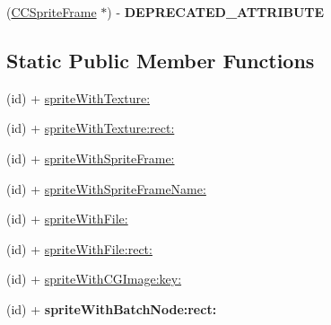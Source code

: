 \begin{DoxyCompactItemize}
\item 
\hypertarget{class_c_c_sprite_a900f618dd7bdba3577593ba08ce3a016}{(\hyperlink{interface_c_c_sprite_frame}{C\-C\-Sprite\-Frame} $\ast$) -\/ {\bfseries D\-E\-P\-R\-E\-C\-A\-T\-E\-D\-\_\-\-A\-T\-T\-R\-I\-B\-U\-T\-E}}\label{class_c_c_sprite_a900f618dd7bdba3577593ba08ce3a016}

\end{DoxyCompactItemize}
\subsection*{Static Public Member Functions}
\begin{DoxyCompactItemize}
\item 
(id) + \hyperlink{class_c_c_sprite_a8ac913fdc5e014a853422e6f289909e5}{sprite\-With\-Texture\-:}
\item 
(id) + \hyperlink{class_c_c_sprite_aa14423d2a7b041588dd5931f5bea586d}{sprite\-With\-Texture\-:rect\-:}
\item 
(id) + \hyperlink{class_c_c_sprite_a8576d90427b850197812d567a43ad48f}{sprite\-With\-Sprite\-Frame\-:}
\item 
(id) + \hyperlink{class_c_c_sprite_a91bec3d54da797f9b62c9ea39be640d3}{sprite\-With\-Sprite\-Frame\-Name\-:}
\item 
(id) + \hyperlink{class_c_c_sprite_aae6176e8b74f4ff32afa07866f4788e6}{sprite\-With\-File\-:}
\item 
(id) + \hyperlink{class_c_c_sprite_a175d89f490a2e643823aa5ca988c66cc}{sprite\-With\-File\-:rect\-:}
\item 
(id) + \hyperlink{class_c_c_sprite_a21e725b7c9bb9b48dd4e68d62b8710b9}{sprite\-With\-C\-G\-Image\-:key\-:}
\item 
\hypertarget{class_c_c_sprite_a1aa5ddc375f8e0f729fce62e9e954405}{(id) + {\bfseries sprite\-With\-Batch\-Node\-:rect\-:}}\label{class_c_c_sprite_a1aa5ddc375f8e0f729fce62e9e954405}

\end{DoxyCompactItemize}
